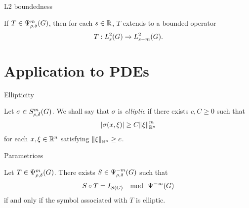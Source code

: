 \documentclass[handout]{beamer}
\begin{document}
\begin{frame}
    {L2 boundedness}

    \begin{theorem}
        If $T \in \OperatorClass m {\rho, \delta}$,
        then for each $s \in \R$,
        $T$ extends to a bounded operator
        \begin{align*}
            T : \Sobolev s \to \Sobolev {s - m}.
        \end{align*}
    \end{theorem}
\end{frame}

\section{Application to PDEs}

\begin{frame}
    {Ellipticity}

    \begin{definition}
        [Ellipticity]

        Let $\sigma \in \SymbolClass m {\rho, \delta}$.
        We shall say that $\sigma$ is \emph{elliptic} if there exists $c, C \geq 0$ such that
        \begin{align*}
            \abs {\sigma(x, \xi)}
            \geq C \norm [\R^n] \xi^m
        \end{align*}
        for each $x, \xi \in \R^n$ satisfying $\norm [\R^n] \xi \geq c$.
    \end{definition}
\end{frame}

\begin{frame}
    {Parametrices}

    \begin{theorem}

        Let $T \in \OperatorClass m {\rho, \delta}$.
        There exists $S \in \OperatorClass {-m} {\rho, \delta}$ such that
        \begin{align*}
            S \circ T = \Id {\Schwartz \Group}
            \quad
            \text{mod } \
            \SmoothingOperators
        \end{align*}
        if and only if the symbol associated with $T$ is elliptic.
    \end{theorem}
\end{frame}
\end{document}
